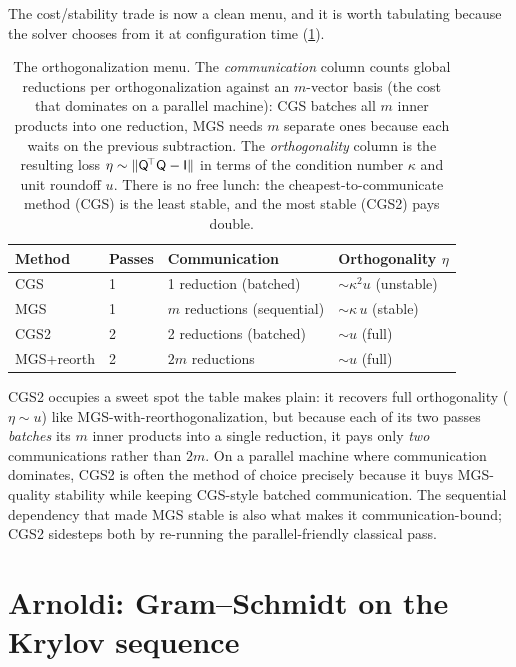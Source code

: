 The cost/stability trade is now a clean menu, and it is worth tabulating because the
solver chooses from it at configuration time (\cref{tab:gstradeoff}).

\begin{table}[t]
\centering
\caption[The orthogonalization cost/stability trade]{The orthogonalization menu. The
\emph{communication} column counts global reductions per orthogonalization against an
$m$-vector basis (the cost that dominates on a parallel machine): CGS batches all $m$
inner products into one reduction, MGS needs $m$ separate ones because each waits on
the previous subtraction. The \emph{orthogonality} column is the resulting loss
$\eta\sim\lVert\mathsf{Q}^{\!\top}\mathsf{Q}-\mathsf{I}\rVert$ in terms of the condition number
$\kappa$ and unit roundoff $u$. There is no free lunch: the cheapest-to-communicate
method (CGS) is the least stable, and the most stable (CGS2) pays double.}
\label{tab:gstradeoff}
\small
\setlength{\tabcolsep}{6pt}
\renewcommand{\arraystretch}{1.25}
\begin{tabular}{@{}llll@{}}
\toprule
Method & Passes & Communication & Orthogonality $\eta$ \\
\midrule
CGS  & 1 & 1 reduction (batched) & $\sim \kappa^2 u$ \quad(unstable) \\
MGS  & 1 & $m$ reductions (sequential) & $\sim \kappa\, u$ \quad(stable) \\
CGS2 & 2 & 2 reductions (batched) & $\sim u$ \quad(full) \\
MGS+reorth & 2 & $2m$ reductions & $\sim u$ \quad(full) \\
\bottomrule
\end{tabular}
\end{table}

CGS2 occupies a sweet spot the table makes plain: it recovers full orthogonality
($\eta\sim u$) like MGS-with-reorthogonalization, but because each of its two passes
\emph{batches} its $m$ inner products into a single reduction, it pays only
\emph{two} communications rather than $2m$. On a parallel machine where communication
dominates, CGS2 is often the method of choice precisely because it buys MGS-quality
stability while keeping CGS-style batched communication. The sequential dependency
that made MGS stable is also what makes it communication-bound; CGS2 sidesteps both
by re-running the parallel-friendly classical pass.

\section{Arnoldi: Gram--Schmidt on the Krylov sequence}
\label{sec:arnoldi}

